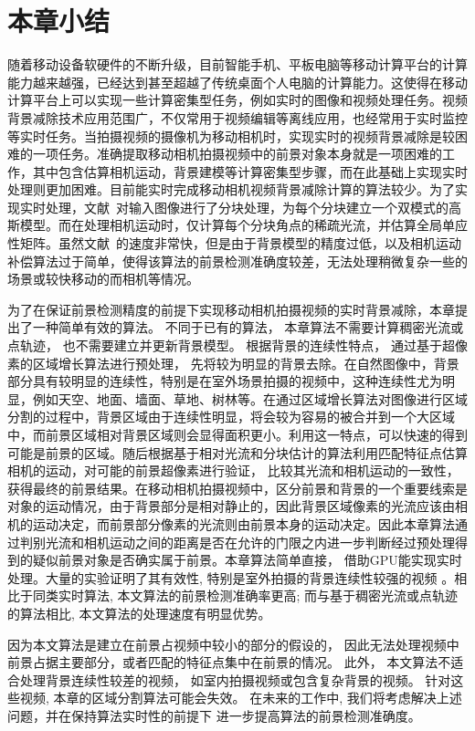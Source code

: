 \section{本章小结}
\label{ch5:sec:conclusions}
随着移动设备软硬件的不断升级，目前智能手机、平板电脑等移动计算平台的计算能力越来越强，已经达到甚至超越了传统桌面个人电脑的计算能力。这使得在移动计算平台上可以实现一些计算密集型任务，例如实时的图像和视频处理任务。视频背景减除技术应用范围广，不仅常用于视频编辑等离线应用，也经常用于实时监控等实时任务。当拍摄视频的摄像机为移动相机时，实现实时的视频背景减除是较困难的一项任务。准确提取移动相机拍摄视频中的前景对象本身就是一项困难的工作，其中包含估算相机运动，背景建模等计算密集型步骤，而在此基础上实现实时处理则更加困难。目前能实时完成移动相机视频背景减除计算的算法较少。为了实现实时处理，文献~对输入图像进行了分块处理，为每个分块建立一个双模式的高斯模型。而在处理相机运动时，仅计算每个分块角点的稀疏光流，并估算全局单应性矩阵。虽然文献~的速度非常快，但是由于背景模型的精度过低，以及相机运动补偿算法过于简单，使得该算法的前景检测准确度较差，无法处理稍微复杂一些的场景或较快移动的而相机等情况。\par
为了在保证前景检测精度的前提下实现移动相机拍摄视频的实时背景减除，本章提出了一种简单有效的算法。 不同于已有的算法， 本章算法不需要计算稠密光流或点轨迹， 也不需要建立并更新背景模型。 根据背景的连续性特点， 通过基于超像素的区域增长算法进行预处理， 先将较为明显的背景去除。在自然图像中，背景部分具有较明显的连续性，特别是在室外场景拍摄的视频中，这种连续性尤为明显，例如天空、地面、墙面、草地、树林等。在通过区域增长算法对图像进行区域分割的过程中，背景区域由于连续性明显，将会较为容易的被合并到一个大区域中，而前景区域相对背景区域则会显得面积更小。利用这一特点，可以快速的得到可能是前景的区域。随后根据基于相对光流和分块估计的算法利用匹配特征点估算相机的运动，对可能的前景超像素进行验证， 比较其光流和相机运动的一致性，获得最终的前景结果。在移动相机拍摄视频中，区分前景和背景的一个重要线索是对象的运动情况，由于背景部分是相对静止的，因此背景区域像素的光流应该由相机的运动决定，而前景部分像素的光流则由前景本身的运动决定。因此本章算法通过判别光流和相机运动之间的距离是否在允许的门限之内进一步判断经过预处理得到的疑似前景对象是否确实属于前景。本章算法简单直接， 借助GPU能实现实时处理。大量的实验证明了其有效性, 特别是室外拍摄的背景连续性较强的视频 。相比于同类实时算法, 本文算法的前景检测准确率更高; 而与基于稠密光流或点轨迹的算法相比, 本文算法的处理速度有明显优势。\par
因为本文算法是建立在前景占视频中较小的部分的假设的， 因此无法处理视频中前景占据主要部分，或者匹配的特征点集中在前景的情况。 此外， 本文算法不适合处理背景连续性较差的视频， 如室内拍摄视频或包含复杂背景的视频。 针对这些视频, 本章的区域分割算法可能会失效。 在未来的工作中, 我们将考虑解决上述问题，并在保持算法实时性的前提下 进一步提高算法的前景检测准确度。
